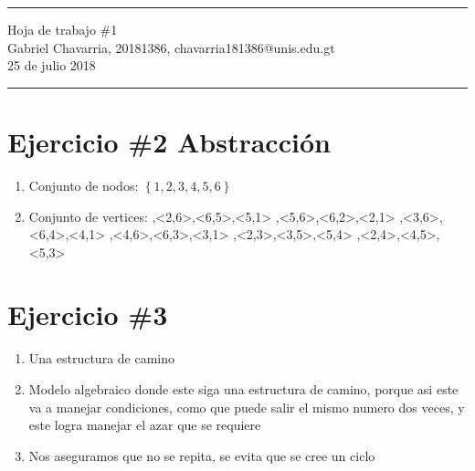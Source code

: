 \documentclass{article}
\newcommand{\horrule}[1]{\rule{\linewidth}{#1}}
\begin{document}
\begin{center}
        \horrule{0.5pt}
        \huge{Hoja de trabajo \#1} \\
        \large{Gabriel Chavarria, 20181386, chavarria181386@unis.edu.gt} \\
\large{25 de julio 2018}\\        
        \horrule{1pt}
\end{center}


\section*{Ejercicio \#2 Abstracción}
\begin{enumerate}
        \item{ Conjunto de nodos: $\left\lbrace 1,2,3,4,5,6\right\rbrace$}
        
       
        
       
        \item{Conjunto de vertices:         \newline\left{},<2,6>,<6,5>,<5,1>\right\rbrace 
        \newline\left{},<5,6>,<6,2>,<2,1>\right\rbrace 
        \newline\left{},<3,6>,<6,4>,<4,1>\right\rbrace 
        \newline\left{},<4,6>,<6,3>,<3,1>\right\rbrace 
        \newline\left{},<2,3>,<3,5>,<5,4>\right\rbrace 
        \newline \left{},<2,4>,<4,5>,<5,3> \right\rbrace  
        
        }
        
         \end{enumerate}        
                


\section*{Ejercicio \#3}
\begin{enumerate}
        \item{ Una estructura de camino}
        \item{Modelo algebraico donde este siga una estructura de camino, porque asi este va a  manejar condiciones, como que puede salir el mismo numero dos veces, y este logra manejar el azar que se requiere  }
        \item{Nos aseguramos que no se repita, se evita que se cree un ciclo}
                
\end{enumerate}
\end{document}
